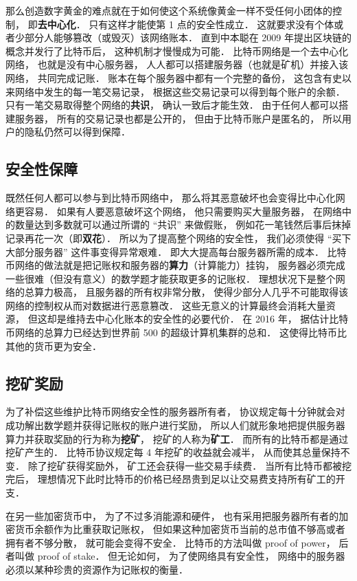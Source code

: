 那么创造数字黄金的难点就在于如何使这个系统像黄金一样不受任何小团体的控制， 即\textbf{去中心化}． 只有这样才能使第 1 点的安全性成立． 这就要求没有个体或者少部分人能够篡改（或毁灭）该网络账本． 直到中本聪在 2009 年提出区块链的概念并发行了比特币后， 这种机制才慢慢成为可能． 比特币网络是一个去中心化网络， 也就是没有中心服务器， 人人都可以搭建服务器（也就是矿机）并接入该网络， 共同完成记账． 账本在每个服务器中都有一个完整的备份， 这包含有史以来网络中发生的每一笔交易记录， 根据这些交易记录可以得到每个账户的余额． 只有一笔交易取得整个网络的\textbf{共识}， 确认一致后才能生效． 由于任何人都可以搭建服务器， 所有的交易记录也都是公开的， 但由于比特币账户是匿名的， 所以用户的隐私仍然可以得到保障．

\subsection{安全性保障}
既然任何人都可以参与到比特币网络中， 那么将其恶意破坏也会变得比中心化网络更容易． 如果有人要恶意破坏这个网络， 他只需要购买大量服务器， 在网络中的数量达到多数就可以通过所谓的 “共识” 来做假账， 例如花一笔钱然后事后抹掉记录再花一次（即\textbf{双花}）． 所以为了提高整个网络的安全性， 我们必须使得 “买下大部分服务器” 这件事变得异常艰难． 即大大提高每台服务器所需的成本． 比特币网络的做法就是把记账权和服务器的\textbf{算力}（计算能力）挂钩， 服务器必须完成一些很难（但没有意义）的数学题才能获取更多的记账权． 理想状况下是整个网络的总算力极高， 且服务器的所有权非常分散， 使得少部分人几乎不可能取得该网络的控制权从而对数据进行恶意篡改． 这些无意义的计算最终会消耗大量资源， 但这却是维持去中心化账本的安全性的必要代价． 在 2016 年， 据估计比特币网络的总算力已经达到世界前 500 的超级计算机集群的总和． 这使得比特币比其他的货币更为安全．

\subsection{挖矿奖励}
为了补偿这些维护比特币网络安全性的服务器所有者， 协议规定每十分钟就会对成功解出数学题并获得记账权的账户进行奖励， 所以人们就形象地把提供服务器算力并获取奖励的行为称为\textbf{挖矿}， 挖矿的人称为\textbf{矿工}． 而所有的比特币都是通过挖矿产生的． 比特币协议规定每 4 年挖矿的收益就会减半， 从而使其总量保持不变． 除了挖矿获得奖励外， 矿工还会获得一些交易手续费． 当所有比特币都被挖完后， 理想情况下此时比特币的价格已经昂贵到足以让交易费支持所有矿工的开支．

在另一些加密货币中， 为了不过多消能源和硬件， 也有采用把服务器所有者的加密货币余额作为比重获取记账权， 但如果这种加密货币当前的总市值不够高或者拥有者不够分散， 就可能会变得不安全． 比特币的方法叫做 proof of power， 后者叫做 proof of stake． 但无论如何， 为了使网络具有安全性， 网络中的服务器必须以某种珍贵的资源作为记账权的衡量．
